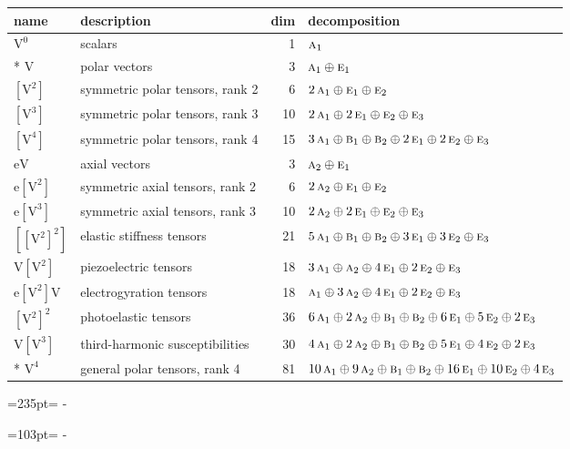 \documentclass[10pt,a4paper]{article}
\newcommand{\needspace}[1]{\par\penalty-100\begingroup\dimen0=#1\relax\dimen2=\pagegoal
  \advance\dimen2-\pagetotal\ifdim\dimen0>\dimen2\relax\ifdim\dimen2>0pt\vfil\break\fi\fi
  \endgroup}
\numberwithin{equation}{section}
\newcommand{\irr}[1]{\text{\normalfont\scshape #1}}
\newcommand{\jahn}[1]{\mathrm{#1}}
\newlength{\fillwidth}\newlength{\cellwidth}\newlength{\colwidth}
\begin{document}
{\begin{longtable}{@{}llr>{\RaggedRight\arraybackslash}p{\fillwidth}@{}}
name & description & dim & decomposition\\\midrule\endhead
\bottomrule\endfoot\endlastfoot
$\jahn{V^{0}}$ & scalars & 1 & $\irr{a}_{1}$\\*
$\jahn{V}$ & polar vectors & 3 & $\irr{a}_{1} \oplus\allowbreak \irr{e}_{1}$\\
$\jahn{[V^{2}]}$ & symmetric polar tensors, rank 2 & 6 & $2\,\irr{a}_{1} \oplus\allowbreak \irr{e}_{1} \oplus\allowbreak \irr{e}_{2}$\\
$\jahn{[V^{3}]}$ & symmetric polar tensors, rank 3 & 10 & $2\,\irr{a}_{1} \oplus\allowbreak 2\,\irr{e}_{1} \oplus\allowbreak \irr{e}_{2} \oplus\allowbreak \irr{e}_{3}$\\
$\jahn{[V^{4}]}$ & symmetric polar tensors, rank 4 & 15 & $3\,\irr{a}_{1} \oplus\allowbreak \irr{b}_{1} \oplus\allowbreak \irr{b}_{2} \oplus\allowbreak 2\,\irr{e}_{1} \oplus\allowbreak 2\,\irr{e}_{2} \oplus\allowbreak \irr{e}_{3}$\\
$\jahn{eV}$ & axial vectors & 3 & $\irr{a}_{2} \oplus\allowbreak \irr{e}_{1}$\\
$\jahn{e[V^{2}]}$ & symmetric axial tensors, rank 2 & 6 & $2\,\irr{a}_{2} \oplus\allowbreak \irr{e}_{1} \oplus\allowbreak \irr{e}_{2}$\\
$\jahn{e[V^{3}]}$ & symmetric axial tensors, rank 3 & 10 & $2\,\irr{a}_{2} \oplus\allowbreak 2\,\irr{e}_{1} \oplus\allowbreak \irr{e}_{2} \oplus\allowbreak \irr{e}_{3}$\\
$\jahn{[[V^{2}]^{2}]}$ & elastic stiffness tensors & 21 & $5\,\irr{a}_{1} \oplus\allowbreak \irr{b}_{1} \oplus\allowbreak \irr{b}_{2} \oplus\allowbreak 3\,\irr{e}_{1} \oplus\allowbreak 3\,\irr{e}_{2} \oplus\allowbreak \irr{e}_{3}$\\
$\jahn{V[V^{2}]}$ & piezoelectric tensors & 18 & $3\,\irr{a}_{1} \oplus\allowbreak \irr{a}_{2} \oplus\allowbreak 4\,\irr{e}_{1} \oplus\allowbreak 2\,\irr{e}_{2} \oplus\allowbreak \irr{e}_{3}$\\
$\jahn{e[V^{2}]V}$ & electrogyration tensors & 18 & $\irr{a}_{1} \oplus\allowbreak 3\,\irr{a}_{2} \oplus\allowbreak 4\,\irr{e}_{1} \oplus\allowbreak 2\,\irr{e}_{2} \oplus\allowbreak \irr{e}_{3}$\\
$\jahn{[V^{2}]^{2}}$ & photoelastic tensors & 36 & $6\,\irr{a}_{1} \oplus\allowbreak 2\,\irr{a}_{2} \oplus\allowbreak \irr{b}_{1} \oplus\allowbreak \irr{b}_{2} \oplus\allowbreak 6\,\irr{e}_{1} \oplus\allowbreak 5\,\irr{e}_{2} \oplus\allowbreak 2\,\irr{e}_{3}$\\
$\jahn{V[V^{3}]}$ & third-harmonic susceptibilities & 30 & $4\,\irr{a}_{1} \oplus\allowbreak 2\,\irr{a}_{2} \oplus\allowbreak \irr{b}_{1} \oplus\allowbreak \irr{b}_{2} \oplus\allowbreak 5\,\irr{e}_{1} \oplus\allowbreak 4\,\irr{e}_{2} \oplus\allowbreak 2\,\irr{e}_{3}$\\*
$\jahn{V^{4}}$ & general polar tensors, rank 4 & 81 & $10\,\irr{a}_{1} \oplus\allowbreak 9\,\irr{a}_{2} \oplus\allowbreak \irr{b}_{1} \oplus\allowbreak \irr{b}_{2} \oplus\allowbreak 16\,\irr{e}_{1} \oplus\allowbreak 10\,\irr{e}_{2} \oplus\allowbreak 4\,\irr{e}_{3}$\\
\bottomrule\end{longtable}}
\needspace{235pt}
\needspace{103pt}
\end{document}
